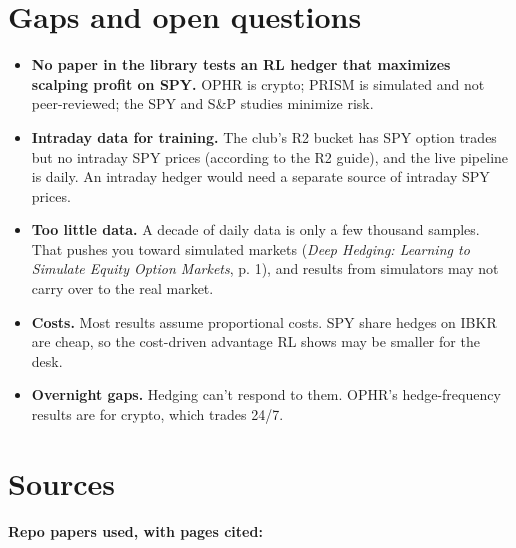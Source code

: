 \documentclass{article}
\begin{document}
\section{Gaps and open questions}

\begin{itemize}

\item \textbf{No paper in the library tests an RL hedger that maximizes scalping profit on SPY.} OPHR is crypto; PRISM is simulated and not peer-reviewed; the SPY and S\&P studies minimize risk.

\item \textbf{Intraday data for training.} The club's R2 bucket has SPY option trades but no intraday SPY prices (according to the R2 guide), and the live pipeline is daily. An intraday hedger would need a separate source of intraday SPY prices.

\item \textbf{Too little data.} A decade of daily data is only a few thousand samples. That pushes you toward simulated markets (\emph{Deep Hedging: Learning to Simulate Equity Option Markets}, p. 1), and results from simulators may not carry over to the real market.

\item \textbf{Costs.} Most results assume proportional costs. SPY share hedges on IBKR are cheap, so the cost-driven advantage RL shows may be smaller for the desk.

\item \textbf{Overnight gaps.} Hedging can't respond to them. OPHR's hedge-frequency results are for crypto, which trades 24/\allowbreak{}7.

\end{itemize}

\section{Sources}

\textbf{Repo papers used, with pages cited:}
\end{document}
